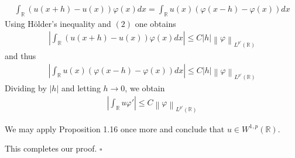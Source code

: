 \documentclass[a4paper,oneside]{book}
\numberwithin{equation}{chapter}
\begin{document}
\begin{enumerate}
\begin{align}
\int_{\mathbb{R}} {\left( {u\left( {x + h} \right) - u\left( x \right)} \right)\varphi \left( x \right)dx}  = \int_{\mathbb{R}} {u\left( x \right)\left( {\varphi \left( {x - h} \right) - \varphi \left( x \right)} \right)dx} 
\end{align}
Using H\"{o}lder's inequality and $\left(2\right)$ one obtains
\begin{align}
\left| {\int_{\mathbb{R}} {\left( {u\left( {x + h} \right) - u\left( x \right)} \right)\varphi \left( x \right)dx} } \right| \le C\left| h \right|{\left\| \varphi  \right\|_{{L^{p'}}\left( {\mathbb{R}} \right)}}
\end{align}
and thus
\begin{align}
\left| {\int_{\mathbb{R}} {u\left( x \right)\left( {\varphi \left( {x - h} \right) - \varphi \left( x \right)} \right)dx} } \right| \le C\left| h \right|{\left\| \varphi  \right\|_{{L^{p'}}\left( {\mathbb{R}} \right)}}
\end{align}
Dividing by $\left| h \right|$ and letting $h\to 0$, we obtain
\begin{align}
\left| {\int_{\mathbb{R}} {u\varphi '} } \right| \le C{\left\| \varphi  \right\|_{{L^{p'}}\left({\mathbb{R}}  \right)}}
\end{align}

We may apply Proposition 1.16 once more and conclude that $u \in W^{1,p}\left(\mathbb{R}\right)$. 
\end{enumerate}
This completes our proof. \hfill $\square$\\
\end{document}
